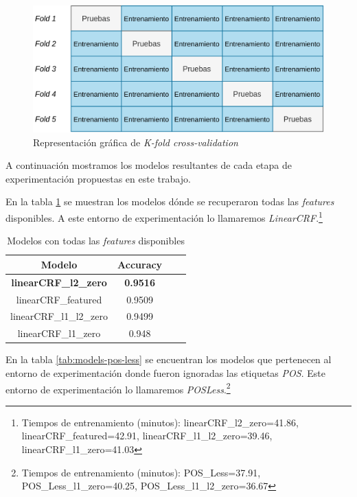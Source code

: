 \documentclass[letterpaper,12pt,oneside]{book}
\theoremstyle{definition}
\begin{document}
\begin{figure}[ht]
    \centering
    \includegraphics[scale=0.8]{img/kfold.png}
    \caption{Representación gráfica de \textit{K-fold cross-validation}}
    \label{fig:k-fold}
\end{figure}

A continuación mostramos los modelos resultantes de cada etapa de experimentación propuestas en este trabajo.

En la tabla \ref{tab:models-full-featured} se muestran los modelos dónde se recuperaron todas las \textit{features} disponibles. A este entorno de experimentación lo llamaremos \textit{LinearCRF}.\footnote{Tiempos de entrenamiento (minutos): linearCRF\_l2\_zero=41.86, linearCRF\_featured=42.91, linearCRF\_l1\_l2\_zero=39.46, linearCRF\_l1\_zero=41.03}

\begin{table}[ht]
    \centering
    \begin{tabular}{| c | c | c | c |}\hline
    \textbf{Modelo} & \textbf{Accuracy}\\\hline
    \textbf{\textsf{linearCRF\_l2\_zero}} & \textbf{0.9516}\\
    \textsf{linearCRF\_featured} & 0.9509\\
    \textsf{linearCRF\_l1\_l2\_zero} & 0.9499\\
    \textsf{linearCRF\_l1\_zero} & 0.948\\\hline
    \end{tabular}
    \caption{Modelos con todas las \textit{features} disponibles}
    \label{tab:models-full-featured}
\end{table}

En la tabla \ref{tab:models-pos-less} se encuentran los modelos que pertenecen al entorno de experimentación donde fueron ignoradas las etiquetas \textit{POS}. Este entorno de experimentación lo llamaremos \textit{POSLess}.\footnote{Tiempos de entrenamiento (minutos): POS\_Less=37.91, POS\_Less\_l1\_zero=40.25, POS\_Less\_l1\_l2\_zero=36.67}
\end{document}
